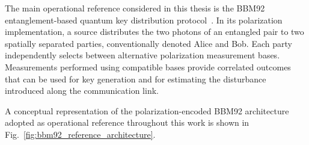 The main operational reference considered in this thesis is the BBM92 entanglement-based
quantum key distribution protocol~\cite{bennett_brassard_mermin_BBM92_1992}.
In its polarization implementation, a source distributes the two photons of an entangled
pair to two spatially separated parties, conventionally denoted Alice and Bob. Each party
independently selects between alternative polarization measurement bases. Measurements
performed using compatible bases provide correlated outcomes that can be used for key
generation and for estimating the disturbance introduced along the communication link.

A conceptual representation of the polarization-encoded BBM92 architecture adopted as
operational reference throughout this work is shown in
Fig.~\ref{fig:bbm92_reference_architecture}.

